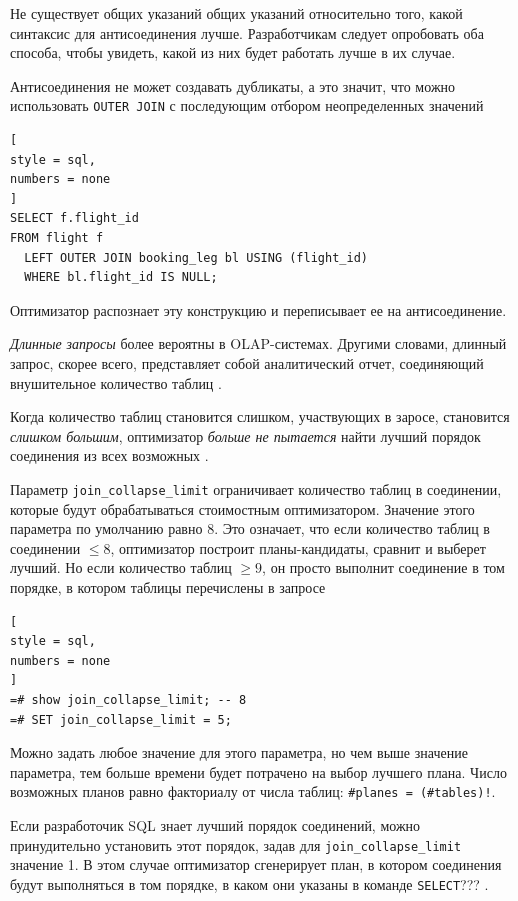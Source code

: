 \documentclass[%
	11pt,
	a4paper,
	utf8,
		]{article}
\begin{document}
Не существует общих указаний общих указаний относительно того, какой синтаксис для антисоединения лучше. Разработчикам следует опробовать оба способа, чтобы увидеть, какой из них будет работать лучше в их случае.

Антисоединения не может создавать дубликаты, а это значит, что можно использовать \verb|OUTER JOIN| с последующим отбором неопределенных значений
\begin{lstlisting}[
style = sql,
numbers = none	
]
SELECT f.flight_id
FROM flight f
  LEFT OUTER JOIN booking_leg bl USING (flight_id)
  WHERE bl.flight_id IS NULL;
\end{lstlisting}

Оптимизатор распознает эту конструкцию и переписывает ее на антисоединение.

\emph{Длинные запросы} более вероятны в OLAP-системах. Другими словами, длинный запрос, скорее всего, представляет собой аналитический отчет, соединяющий внушительное количество таблиц \cite[]{dombrovskaya:postgresql-2022}.

Когда количество таблиц становится слишком, участвующих в заросе, становится \emph{слишком большим}, оптимизатор \emph{больше не пытается} найти лучший порядок соединения из всех возможных \cite[]{dombrovskaya:postgresql-2022}.

Параметр \verb|join_collapse_limit| ограничивает количество таблиц в соединении, которые будут обрабатываться стоимостным оптимизатором. Значение этого параметра по умолчанию равно 8. Это означает, что если количество таблиц в соединении $ \leqslant 8 $, оптимизатор построит планы-кандидаты, сравнит и выберет лучший. Но если количество таблиц $ \geqslant 9 $, он просто выполнит соединение в том порядке, в котором таблицы перечислены в запросе
\begin{lstlisting}[
style = sql,
numbers = none	
]
=# show join_collapse_limit; -- 8
=# SET join_collapse_limit = 5;
\end{lstlisting}

Можно задать любое значение для этого параметра, но чем выше значение параметра, тем больше времени будет потрачено на выбор лучшего плана. Число возможных планов равно факториалу от числа таблиц: \verb|#planes = (#tables)!|.

Если разработочик SQL знает лучший порядок соединений, можно принудительно установить этот порядок, задав для \verb|join_collapse_limit| значение 1. В этом случае оптимизатор сгенерирует план, в котором соединения будут выполняться в том порядке, в каком они указаны в команде \verb|SELECT|??? \cite[]{dombrovskaya:postgresql-2022}.
\end{document}
